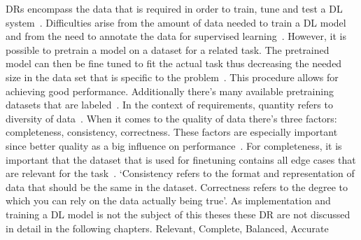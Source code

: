 \acp{DR} encompass the data that is required in order to train, tune and test a \ac{DL}
system~\cite{vogelsang_requirements_2019}.
Difficulties arise from the amount of data needed to train a \ac{DL} model and from the need to
annotate the data for supervised learning~\cite{nowruzi_how_2019}.
However, it is possible to pretrain a model on a dataset for a related task.
The pretrained model can then be fine tuned to fit the actual task thus decreasing the needed size
in the data set that is specific to the problem~\cite{ouyang_factors_2016}.
This procedure allows for achieving good performance.
Additionally there's many available pretraining datasets that are labeled~\cite{ouyang_factors_2016}.
In the context of requirements, quantity refers to diversity of data~\cite{vogelsang_requirements_2019}.
When it comes to the quality of data there's three factors: completeness, consistency,
correctness.
These factors are especially important since better quality as a big influence on
performance~\cite{vogelsang_requirements_2019}.
For completeness, it is important that the dataset that is used for finetuning contains all edge
cases that are relevant for the task~\cite{arpteg_software_2018, vogelsang_requirements_2019}.
`Consistency refers to the format and representation of data that should be the same in the dataset. Correctness refers to the degree to which you can rely on the data actually being
true'\cite{vogelsang_requirements_2019}.
As implementation and training a \ac{DL} model is not the subject of this theses these \ac{DR} are
not discussed in detail in the following chapters.
Relevant, Complete, Balanced, Accurate~\cite{ashmore_assuring_2021}
